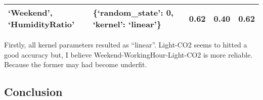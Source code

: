 \documentclass[11pt]{article}
\begin{document}
\begin{longtable}[]{@{}lllll@{}}
\begin{minipage}[t]{0.34\columnwidth}
`Weekend', `HumidityRatio'\strut
\end{minipage} & \begin{minipage}[t]{0.33\columnwidth}\raggedright
\{`random\_state': 0, `kernel': `linear'\}\strut
\end{minipage} & \begin{minipage}[t]{0.06\columnwidth}\raggedright
0.62\strut
\end{minipage} & \begin{minipage}[t]{0.06\columnwidth}\raggedright
0.40\strut
\end{minipage} & \begin{minipage}[t]{0.06\columnwidth}\raggedright
0.62\strut
\end{minipage}\tabularnewline
\bottomrule
\end{longtable}

    Firstly, all kernel parameters resulted as ``linear''. Light-CO2 seems
to hitted a good accuracy but, I believe Weekend-WorkingHour-Light-CO2
is more reliable. Because the former may had become underfit.

    \hypertarget{conclusion}{%
\subsection{Conclusion}\label{conclusion}}
\end{document}
